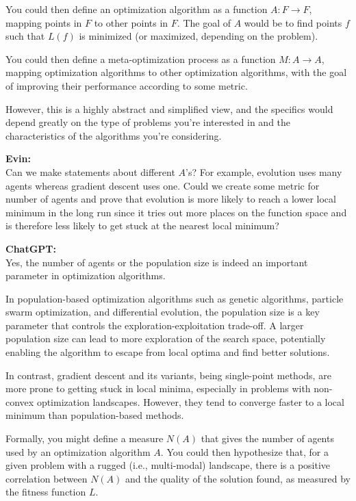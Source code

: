 \documentclass{article}[10pt]
\begin{document}
You could then define an optimization algorithm as a function \( A: F \rightarrow F \), mapping points in \( F \) to other points in \( F \). 
The goal of \( A \) would be to find points \( f \) such that \( L(f) \) is minimized (or maximized, depending on the problem).\par

You could then define a meta-optimization process as a function \( M: A \rightarrow A \), mapping optimization algorithms to other optimization algorithms, with the goal of improving their performance according to some metric.\par

However, this is a highly abstract and simplified view, and the specifics would depend greatly on the type of problems you're interested in and the characteristics of the algorithms you're considering.\par


\noindent \textbf{Evin:}\\
Can we make statements about different $A$'s? 
For example, evolution uses many agents whereas gradient descent uses one. 
Could we create some metric for number of agents and prove that evolution is more likely to reach a lower local minimum in the long run since it tries out more places on the function space and is therefore less likely to get stuck at the nearest local minimum?\par

\noindent \textbf{ChatGPT:}\\
Yes, the number of agents or the population size is indeed an important parameter in optimization algorithms. \par

In population-based optimization algorithms such as genetic algorithms, particle swarm optimization, and differential evolution, the population size is a key parameter that controls the exploration-exploitation trade-off. 
A larger population size can lead to more exploration of the search space, potentially enabling the algorithm to escape from local optima and find better solutions. \par

In contrast, gradient descent and its variants, being single-point methods, are more prone to getting stuck in local minima, especially in problems with non-convex optimization landscapes. 
However, they tend to converge faster to a local minimum than population-based methods.\par

Formally, you might define a measure \( N(A) \) that gives the number of agents used by an optimization algorithm \( A \). 
You could then hypothesize that, for a given problem with a rugged (i.e., multi-modal) landscape, there is a positive correlation between \( N(A) \) and the quality of the solution found, as measured by the fitness function \( L \).\par
\end{document}
